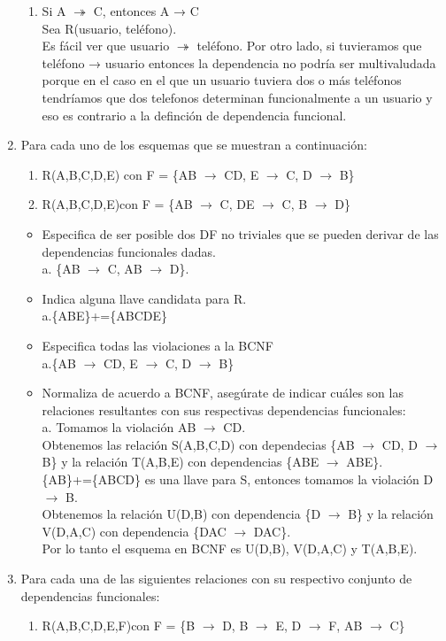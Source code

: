 \documentclass[a4paper, 12pt]{report}
\begin{document}
\begin{enumerate}
{\begin{enumerate}
    \item Si A $\twoheadrightarrow$ C, entonces A → C\\

        Sea R(usuario, teléfono).\\
        Es fácil ver que usuario $\twoheadrightarrow$ teléfono. Por otro lado,
        si tuvieramos que teléfono → usuario entonces la dependencia no podría
        ser multivaludada porque en el caso en el que un usuario tuviera dos o
        más teléfonos tendríamos que dos telefonos determinan funcionalmente a
        un usuario y eso es contrario a la definción de dependencia funcional.
\end{enumerate}}
\item {Para cada uno de los esquemas que se muestran a continuación:
\begin{enumerate}
	\item R(A,B,C,D,E) con F = \{AB $\rightarrow$ CD, E $\rightarrow$ C, D
		$\rightarrow$ B\}
	\item R(A,B,C,D,E)con F = \{AB $\rightarrow$ C, DE $\rightarrow$ C, B $\rightarrow$ D\}
\end{enumerate}
\begin{itemize}
	\item Especifica de  ser  posible dos DF  no  triviales que  se  pueden
	derivar  de  las  dependencias funcionales dadas.\\
	a. \{AB $\rightarrow$ C, AB $\rightarrow$ D\}.\\
	\item Indica alguna llave candidata para R.\\
	a.\{ABE\}+=\{ABCDE\}\\
	\item Especifica todas las violaciones a la BCNF\\
	a.\{AB $\rightarrow$ CD, E $\rightarrow$ C, D
	$\rightarrow$ B\}
	\item Normaliza de acuerdo a BCNF, asegúrate de indicar cuáles son las
	relaciones resultantes con sus respectivas dependencias funcionales:\\
	a. Tomamos la violación AB $\rightarrow$ CD.\\
	Obtenemos las relación S(A,B,C,D) con dependecias \{AB $\rightarrow$ CD,
	D $\rightarrow$ B\} y la relación T(A,B,E) con dependencias \{ABE $\rightarrow$ ABE\}.\\
	\{AB\}+=\{ABCD\} es una llave para S, entonces tomamos la violación D $\rightarrow$ B.\\
	Obtenemos la relación U(D,B) con dependencia \{D $\rightarrow$ B\} y la
	relación V(D,A,C) con dependencia \{DAC $\rightarrow$ DAC\}.\\
	Por lo tanto el esquema en BCNF es U(D,B), V(D,A,C) y T(A,B,E).
\end{itemize}}
\item Para cada una de  las  siguientes  relaciones  con  su  respectivo  conjunto  de  dependencias funcionales:
\begin{enumerate}
	\item R(A,B,C,D,E,F)con F = \{B $\rightarrow$ D, B $\rightarrow$ E,
            D $\rightarrow$ F, AB $\rightarrow$ C\}\\


\end{enumerate}
\end{enumerate}
\end{document}
